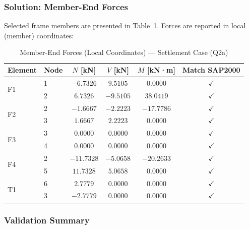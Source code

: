 \documentclass[12pt,a4paper]{article}
\begin{document}
\subsubsection{Solution: Member-End Forces}

Selected frame members are presented in Table~\ref{tab:settlement_member_forces}. Forces are reported in local (member) coordinates:

\begin{table}[H]
    \centering
    \caption{Member-End Forces (Local Coordinates) --- Settlement Case (Q2a)}
    \label{tab:settlement_member_forces}
    \begin{tabular}{llcccc}
        \toprule
        \textbf{Element} & \textbf{Node} & \textbf{$N$ [kN]} & \textbf{$V$ [kN]} & \textbf{$M$ [kN·m]} & \textbf{Match SAP2000} \\
        \midrule
        \multirow{2}{*}{F1} & 1 & $-6.7326$  & $9.5105$  & $0.0000$   & $\checkmark$ \\
                            & 2 & $6.7326$   & $-9.5105$ & $38.0419$  & $\checkmark$ \\
        \midrule
        \multirow{2}{*}{F2} & 2 & $-1.6667$  & $-2.2223$ & $-17.7786$ & $\checkmark$ \\
                            & 3 & $1.6667$   & $2.2223$  & $0.0000$   & $\checkmark$ \\
        \midrule
        \multirow{2}{*}{F3} & 3 & $0.0000$   & $0.0000$  & $0.0000$   & $\checkmark$ \\
                            & 4 & $0.0000$   & $0.0000$  & $0.0000$   & $\checkmark$ \\
        \midrule
        \multirow{2}{*}{F4} & 2 & $-11.7328$ & $-5.0658$ & $-20.2633$ & $\checkmark$ \\
                            & 5 & $11.7328$  & $5.0658$  & $0.0000$   & $\checkmark$ \\
        \midrule
        \multirow{2}{*}{T1} & 6 & $2.7779$   & $0.0000$  & $0.0000$   & $\checkmark$ \\
                            & 3 & $-2.7779$  & $0.0000$  & $0.0000$   & $\checkmark$ \\
        \bottomrule
    \end{tabular}
\end{table}

\subsubsection{Validation Summary}
\end{document}
